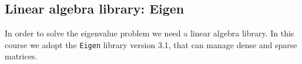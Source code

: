 \subsection*{Linear algebra library: Eigen}

In order to solve the eigenvalue problem we need a linear algebra library. In
this course we adopt the \texttt{Eigen} library version 3.1, that can manage
dense and sparse matrices.

